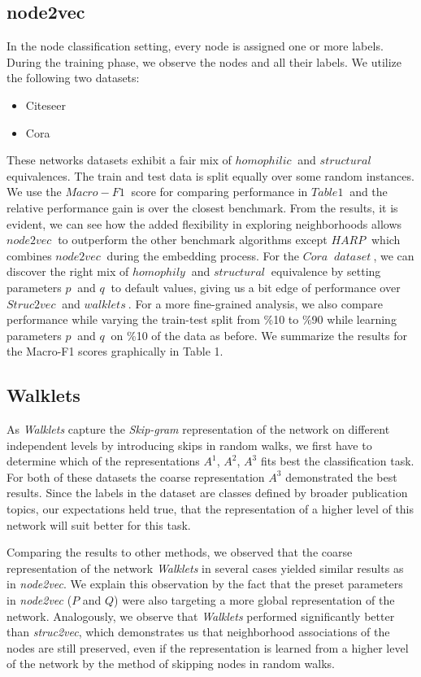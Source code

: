 \documentclass[a4paper,13pt]{article}
\begin{document}
\subsection{\textbf{node2vec}}

In the node classification setting, every node is assigned one or more labels. During the training phase, we observe the nodes and all their labels. We utilize the following two datasets:
\begin{itemize}
\item Citeseer 
\item Cora
\end{itemize}
These networks datasets exhibit a fair mix of $ homophilic \ $ and $ structural \ $ equivalences. 
The train and test data is split equally over some random instances. We use the $ Macro-F1 \ $ score for comparing performance in $ Table 1 \ $  and the relative performance gain is over the closest benchmark. From the results, it is evident, we can see how the added flexibility in exploring neighborhoods allows $ node2vec \ $ to outperform the other benchmark algorithms except $ HARP \ $ which combines $ node2vec \ $ during the embedding process. For the $ Cora \ $  $ dataset \ $, we can discover the right mix of $ homophily \ $ and $ structural \ $ equivalence by setting parameters $ p \ $ and $ q \ $ to default values, giving us a bit edge of performance over $ Struc2vec \ $ and $ walklets \ $.  
For a more fine-grained analysis, we also compare performance while varying the train-test split from \%10 to \%90 while learning parameters $ p \ $ and $ q \ $ on \%10 of the data as before. 
We summarize the results for the Macro-F1 scores graphically in Table 1.

\subsection{\textbf{Walklets}}
As \textit{Walklets} capture the \textit{Skip-gram} representation of the network on different independent levels by introducing skips in random walks, we first have to determine which of the representations $A^1$, $A^2$, $A^3$ fits best the classification task. For both of these datasets the coarse representation $A^3$ demonstrated the best results. Since the labels in the dataset are classes defined by broader publication topics, our expectations held true, that the representation of a higher level of this network will suit better for this task.

Comparing the results to other methods, we observed that the coarse representation of the network \textit{Walklets} in several cases yielded similar results as in \textit{node2vec}. We explain this observation by the fact that the preset parameters in \textit{node2vec} ($P$ and $Q$) were also targeting a more global representation of the network. Analogously, we observe that \textit{Walklets} performed significantly better than \textit{struc2vec}, which demonstrates us that neighborhood associations of the nodes are still preserved, even if the representation is learned from a higher level of the network by the method of skipping nodes in random walks.
\end{document}

